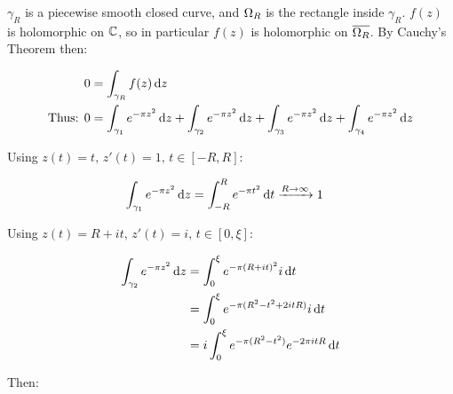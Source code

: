 \begin{example}
\begin{center}
\end{center}

$\gamma_R$ is a piecewise smooth closed curve, and $\Omega_R$ is the rectangle inside $\gamma_R$. $f(z)$ is holomorphic on $\mathbb{C}$, so in particular $f(z)$ is holomorphic on $\overline{\Omega_R}$. By Cauchy's Theorem then:



\begin{align*}
      0  &= \int_{\gamma_R} f(z) \dif z\\
    \text{Thus: } 0 &= \int_{\gamma_1} e^{-\pi z^2} \dif z + \int_{\gamma_2} e^{-\pi z^2} \dif z + \int_{\gamma_3} e^{-\pi z^2} \dif z + \int_{\gamma_4} e^{-\pi z^2} \dif z\\
\end{align*}

Using $z(t) = t, \, z'(t) = 1,  \, t \in [-R,R]$:

\begin{align*}
    \int_{\gamma_1} e^{-\pi z^2} \dif z = \int_{-R}^R e^{-\pi t^2}  \dif t & \xrightarrow{R\to \infty} 1 
\end{align*}

Using $z(t) = R + it, \, z'(t) = i,  \, t \in [0,\xi]$:

\begin{align*}
    \int_{\gamma_2} e^{-\pi z^2} \dif z &= \int_{0}^\xi e^{-\pi (R+it)^2} i \dif t \\ 
    &= \int_{0}^\xi e^{-\pi (R^2-t^2+2itR)} i \dif t\\
    &= i \int_{0}^\xi e^{-\pi (R^2-t^2)} e^{-2 \pi i t R}  \dif t\\
\end{align*}

Then:


\end{example}
